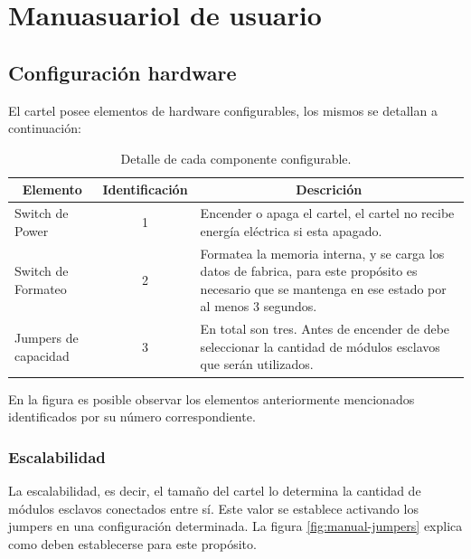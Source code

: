 \section{Manuasuariol de usuario} \label{sec:manual-usuario}

\subsection{Configuración hardware}

El cartel posee elementos de hardware configurables, los mismos se detallan a continuación:

\begin{table}[ht!]
	\centering
	\caption{Detalle de cada componente configurable.}
	\label{my-label}
	\begin{tabular}{lcp{}}
		\multicolumn{1}{c}{Elemento}	& Identificación & \multicolumn{1}{c}{Descrición} \\ \hline
		Switch de Power         		& 1              & Encender o apaga el cartel, el cartel no recibe energía eléctrica si esta apagado. \\ \hline
		Switch de Formateo      		& 2              & Formatea la memoria interna, y se carga los datos de fabrica, para este propósito es necesario que se mantenga en ese estado por al menos 3 segundos. \\ \hline
		Jumpers de capacidad 			& 3              & En total son tres. Antes de encender de debe seleccionar la cantidad de módulos esclavos que serán utilizados. \\ \hline
	\end{tabular}
\end{table}

En la figura es posible observar los elementos anteriormente mencionados identificados por su número correspondiente.

\subsubsection{Escalabilidad}
La escalabilidad, es decir, el tamaño del cartel lo determina la cantidad de módulos esclavos conectados entre sí. Este valor se establece activando los jumpers en una configuración determinada. La figura \ref{fig:manual-jumpers} explica como deben establecerse para este propósito.


